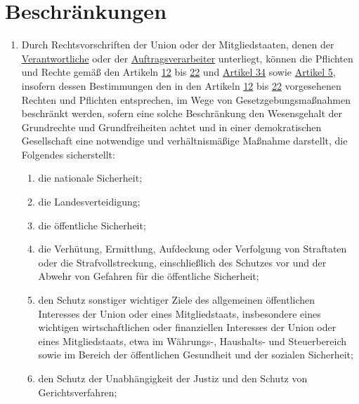 \chapter{Beschränkungen}
\label{ch:23}

\begin{enumerate}

  \item Durch Rechtsvorschriften der Union oder der Mitgliedstaaten, denen der \hyperref[itm:04-7]{Verantwortliche} oder
   der
   \hyperref[itm:04-8]{Auftragsverarbeiter} unterliegt, können die Pflichten und Rechte gemäß den Artikeln \hyperref
    [ch:12]{12} bis \hyperref[ch:22]{22} und \hyperref[ch:34]{Artikel 34} sowie \hyperref[ch:5]{Artikel 5}, insofern
    dessen Bestimmungen den in den Artikeln \hyperref[ch:12]{12} bis \hyperref[ch:22]{22} vorgesehenen Rechten und
    Pflichten entsprechen, im Wege von Gesetzgebungsmaßnahmen beschränkt werden, sofern eine solche Beschränkung den
    Wesensgehalt der Grundrechte und Grundfreiheiten achtet und in einer demokratischen Gesellschaft eine notwendige
    und verhältnismäßige Maßnahme darstellt, die Folgendes sicherstellt:%
  \label{itm:23-1}

  \begin{enumerate}
  
    \item die nationale Sicherheit;%
    \label{itm:23-1a}

    \item die Landesverteidigung;%
    \label{itm:23-1b}

    \item die öffentliche Sicherheit;%
    \label{itm:23-1c}

    \item die Verhütung, Ermittlung, Aufdeckung oder Verfolgung von Straftaten oder die Strafvollstreckung,
     einschließlich des Schutzes vor und der Abwehr von Gefahren für die öffentliche Sicherheit;%
    \label{itm:23-1d}

    \item den Schutz sonstiger wichtiger Ziele des allgemeinen öffentlichen Interesses der Union oder eines
     Mitgliedstaats, insbesondere eines wichtigen wirtschaftlichen oder finanziellen Interesses der Union oder eines
     Mitgliedstaats, etwa im Währungs-, Haushalts- und Steuerbereich sowie im Bereich der öffentlichen Gesundheit und
     der sozialen Sicherheit;%
    \label{itm:23-1e}

    \item den Schutz der Unabhängigkeit der Justiz und den Schutz von Gerichtsverfahren;%
    \label{itm:23-1f}


\end{enumerate}
\end{enumerate}
